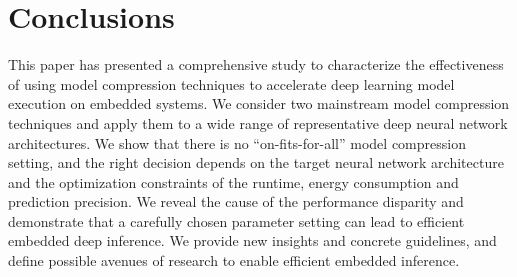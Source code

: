 \section{Conclusions}
This paper has presented a comprehensive study to characterize the effectiveness of using model compression techniques to accelerate deep
learning model execution on embedded systems. We consider two mainstream model compression techniques and apply them to a wide range of
representative deep neural network architectures. We show that there is no ``on-fits-for-all” model compression setting, and the right
decision depends on the target neural network architecture and the optimization constraints of the runtime, energy consumption and
prediction precision. We reveal the cause of the performance disparity and demonstrate that a carefully chosen parameter setting can lead
to efficient embedded deep inference. We provide new insights and concrete guidelines, and define possible avenues of research to enable
efficient embedded inference.
